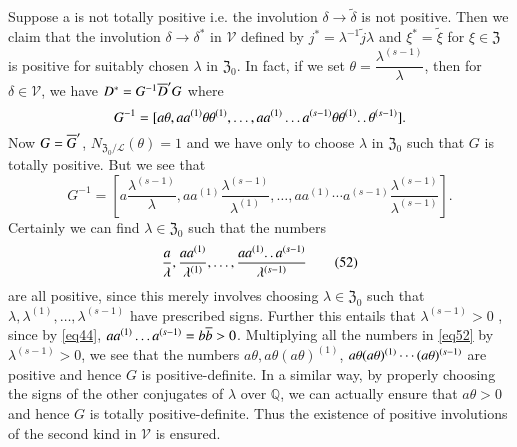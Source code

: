 Suppose a is not totally positive i.e. the involution $\delta
\rightarrow \widetilde{\delta}$ is not positive. Then we claim that
the involution $\delta \rightarrow \delta^{\ast}$ in $\mathscr{V}$
defined by $j^{\ast}=\lambda^{-1}\widetilde{j}\lambda$ and $\xi^{\ast}
= \widetilde{\xi}$ for $\xi \in \mathfrak{Z}$ is positive for suitably
chosen $\lambda$ in $\mathfrak{Z}_0$. In fact, if we set $\theta =
\dfrac{\lambda^{(s-1)}}{\lambda}$, then for $\delta \in \mathscr{V}$,
we \pageoriginale have $D^{\ast} = G^{-1} \overline{D}'G$ where
$$
G^{-1} = [a \theta, a a^{(1)} \theta \theta^{(1)},\ldots, a
  a^{(1)}\ldots a^{(s-1)} \theta \theta^{(1)}\ldotp\ldotp
  \theta^{(s-1)}]. 
$$
Now $G=\overline{G}'$, $N_{\mathfrak{Z}_0/\mathscr{L}}(\theta)=1$ and we
have only to choose $\lambda$ in $\mathfrak{Z}_0$ such that $G$ is
totally positive. But we see that
$$
G^{-1} = \left[a \frac{\lambda^{(s-1)}}{\lambda}, aa^{(1)}
  \frac{\lambda^{(s-1)}}{\lambda^{(1)}}, \ldots, a a^{(1)} \cdots
  a^{(s-1)} \frac{\lambda^{(s-1)}}{\lambda^{(s-1)}}\right]. 
$$
Certainly we can find $\lambda \in \mathfrak{Z}_0$ such that the
numbers
\begin{equation*}
\frac{a}{\lambda}, \frac{a a^{(1)}}{\lambda^{(1)}}, \ldots,
\frac{aa^{(1)} \ldotp\ldotp a^{(s-1)}}{\lambda^{(s-1)}} \tag{52}\label{eq52}
\end{equation*}
are all positive, since this merely involves choosing $\lambda \in
\mathfrak{Z}_0$ such that $\lambda, \lambda^{(1)},\ldots,
\lambda^{(s-1)}$ have prescribed signs. Further this entails that
$\lambda^{(s-1)}>0$ , since by \eqref{eq44}, $a a^{(1)}\ldots a^{(s-1)} = b
\overline{b}>0$. Multiplying all the numbers in \eqref{eq52} by $\lambda^{(s-1)}>0$,
we see that the numbers $a\theta, a\theta(a\theta)^{(1)}$,
$a\theta(a\theta)^{(1)} \cdots\break (a\theta)^{(s-1)}$ are positive and
hence $G$ is positive-definite. In a similar way, by properly choosing
the signs of the other conjugates of $\lambda$ over $\mathbb{Q}$, we
can actually ensure that $a\theta >0$ and hence $G$ is totally
positive-definite. Thus the existence of positive involutions of the
second kind in $\mathscr{V}$ is ensured.

